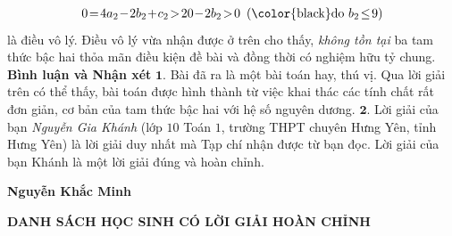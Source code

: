 \begin{multicols}{2}
	\begin{align*}
		0 \!=\! 4{a_2}\! -\! 2{b_2}\! +\! {c_2}\! >\! 20 \!-\! 2{b_2}\! >\! 0 \,\,\,(\text{\color{black}do } b_2 \!\le\! 9)
	\end{align*}
	là điều vô lý.
	\vskip 0.05cm
	Điều vô lý vừa nhận được ở trên cho thấy, \textit{không tồn tại} ba tam thức bậc hai thỏa mãn điều kiện đề bài và đồng thời có nghiệm hữu tỷ chung.
	\vskip 0.05cm
	\textbf{\color{thachthuctoanhoc}Bình luận và Nhận xét}
	\vskip 0.05cm
	$\pmb{1.}$ Bài đã ra là một bài toán hay, thú vị. Qua lời giải trên có thể thấy, bài toán được hình thành từ việc khai thác các tính chất rất đơn giản, cơ bản của tam thức bậc hai với hệ số nguyên dương.
	\vskip 0.05cm
	$\pmb{2.}$ Lời giải của bạn \textit{Nguyễn Gia Khánh} (lớp $10$ Toán $1$, trường THPT chuyên Hưng Yên, tỉnh Hưng Yên) là lời giải duy nhất mà Tạp chí nhận được từ bạn đọc. Lời giải của bạn Khánh là một lời giải đúng và hoàn chỉnh.
	\begin{flushright}
		\textbf{\color{thachthuctoanhoc}Nguyễn Khắc Minh}
	\end{flushright}
\end{multicols}
\begin{center}
	\textbf{\color{thachthuctoanhoc}DANH SÁCH HỌC SINH CÓ LỜI GIẢI HOÀN CHỈNH}
\end{center}
